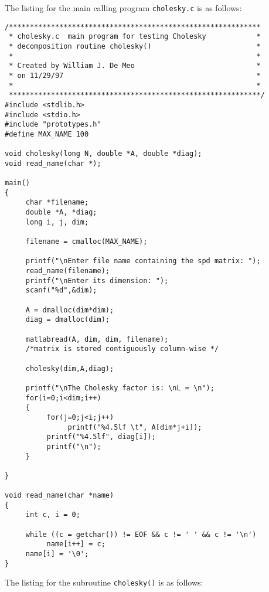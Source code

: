 \documentclass{article}
\begin{document}
The listing for the main calling program {\tt cholesky.c} is as
follows:
\begin{verbatim}
/************************************************************
 * cholesky.c  main program for testing Cholesky            *
 * decomposition routine cholesky()                         *
 *                                                          *
 * Created by William J. De Meo                             *
 * on 11/29/97                                              *
 *                                                          *
 ************************************************************/
#include <stdlib.h>
#include <stdio.h>
#include "prototypes.h"
#define MAX_NAME 100

void cholesky(long N, double *A, double *diag);
void read_name(char *);

main()
{
     char *filename;
     double *A, *diag;
     long i, j, dim;
  
     filename = cmalloc(MAX_NAME);

     printf("\nEnter file name containing the spd matrix: ");
     read_name(filename);
     printf("\nEnter its dimension: ");
     scanf("%d",&dim);

     A = dmalloc(dim*dim);
     diag = dmalloc(dim);
  
     matlabread(A, dim, dim, filename); 
     /*matrix is stored contiguously column-wise */

     cholesky(dim,A,diag);
     
     printf("\nThe Cholesky factor is: \nL = \n");
     for(i=0;i<dim;i++)
     {
          for(j=0;j<i;j++)
               printf("%4.5lf \t", A[dim*j+i]);
          printf("%4.5lf", diag[i]);
          printf("\n");
     }
         
}
  
void read_name(char *name)
{
     int c, i = 0;
  
     while ((c = getchar()) != EOF && c != ' ' && c != '\n')
          name[i++] = c;
     name[i] = '\0';
}
\end{verbatim}  
The listing for the subroutine {\tt cholesky()} is as follows:
\end{document}
